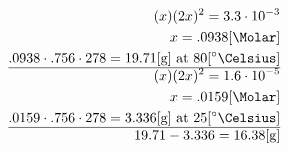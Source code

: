 \documentclass[12pt]{article}
\begin{document}
\begin{enumerate}
        \begin{equation}
          \begin{split}
            (x)(2x)^2=3.3\cdot10^{-3}\\
            x=.0938[\si{\Molar}]\\
          .0938\cdot.756\cdot278=19.71[\si{\gram}]\text{ at }80[\si{\degree\Celsius}]\\
            \hline
          (x)(2x)^2=1.6\cdot10^{-5}\\
            x=.0159[\si{\Molar}]\\
            .0159\cdot.756\cdot278=3.336[\si{\gram}]\text{ at }25[\si{\degree\Celsius}]\\
            \hline
            19.71-3.336=16.38[\si{\gram}]
          \end{split}
          \label{11}
        \end{equation}

\end{enumerate}
\end{document}
